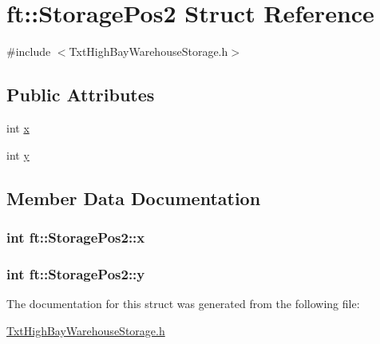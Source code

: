 \hypertarget{structft_1_1_storage_pos2}{}\section{ft\+:\+:Storage\+Pos2 Struct Reference}
\label{structft_1_1_storage_pos2}


{\ttfamily \#include $<$Txt\+High\+Bay\+Warehouse\+Storage.\+h$>$}

\subsection*{Public Attributes}
\begin{DoxyCompactItemize}
\item 
int \hyperlink{structft_1_1_storage_pos2_ac08eedb92bdec6ec5271afc19e4102b9}{x}
\item 
int \hyperlink{structft_1_1_storage_pos2_a7b7946c712f12343cbe903623b06f704}{y}
\end{DoxyCompactItemize}


\subsection{Member Data Documentation}
\subsubsection[{\texorpdfstring{x}{x}}]{\setlength{\rightskip}{0pt plus 5cm}int ft\+::\+Storage\+Pos2\+::x}\hypertarget{structft_1_1_storage_pos2_ac08eedb92bdec6ec5271afc19e4102b9}{}\label{structft_1_1_storage_pos2_ac08eedb92bdec6ec5271afc19e4102b9}
\subsubsection[{\texorpdfstring{y}{y}}]{\setlength{\rightskip}{0pt plus 5cm}int ft\+::\+Storage\+Pos2\+::y}\hypertarget{structft_1_1_storage_pos2_a7b7946c712f12343cbe903623b06f704}{}\label{structft_1_1_storage_pos2_a7b7946c712f12343cbe903623b06f704}


The documentation for this struct was generated from the following file\+:\begin{DoxyCompactItemize}
\item 
\hyperlink{_txt_high_bay_warehouse_storage_8h}{Txt\+High\+Bay\+Warehouse\+Storage.\+h}\end{DoxyCompactItemize}
